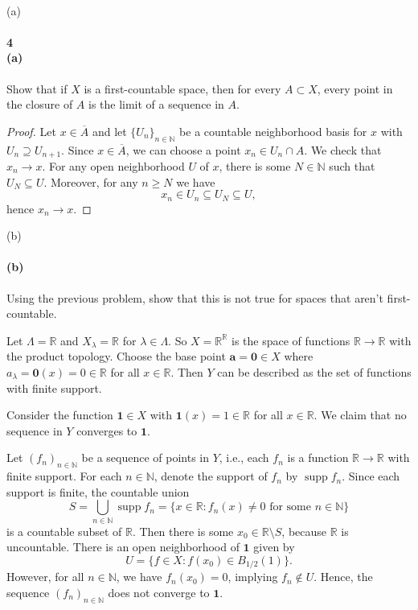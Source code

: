 \documentclass[12pt]{article}
\newlength{\myparskip}
\newenvironment{fullbox}{\begin{lrbox}{\savefullbox}\begin{minipage}{\dimexpr\textwidth-2\fboxsep\relax}\setlength{\parskip}{\myparskip}}{\end{minipage}\end{lrbox}\framebox[\textwidth]{\usebox{\savefullbox}}}
\newenvironment{pbox}[1][]{\begin{fullbox}\ifx#1\empty\else\paragraph{#1}\fi}{\end{fullbox}}
\newcommand{\N}{\mathbb{N}}
\newcommand{\R}{\mathbb{R}}
\newcommand{\<}{\langle}
\renewcommand{\>}{\rangle}
\newcommand{\clo}{\overline}
\theoremstyle{definition}
\begin{document}
\newpage
\begin{pbox}[4 \\ (a)]
    Show that if $X$ is a first-countable space, then for every $A \subset X$, every point in the closure of $A$ is the limit of a sequence in $A$.
\end{pbox}

\begin{proof}
    Let $x \in \clo{A}$ and let $\{U_n\}_{n \in \N}$ be a countable neighborhood basis for $x$ with $U_n \supseteq U_{n + 1}$. Since $x \in \clo{A}$, we can choose a point $x_n \in U_n \cap A$. We check that $x_n \to x$. For any open neighborhood $U$ of $x$, there is some $N \in \N$ such that $U_N \subseteq U$. Moreover, for any $n \geq N$ we have
    \[
        x_n \in U_n \subseteq U_N \subseteq U,
    \]
    hence $x_n \to x$.
\end{proof}

\begin{pbox}[(b)]
    Using the previous problem, show that this is not true for spaces that aren't first-countable.
\end{pbox}

Let $\Lambda = \R$ and $X_\lambda = \R$ for $\lambda \in \Lambda$.
So $X = \R^\R$ is the space of functions $\R \to \R$ with the product topology.
Choose the base point $\mathbf{a} = \mathbf{0} \in X$ where $a_\lambda = \mathbf{0}(x) = 0 \in \R$ for all $x \in \R$.
Then $Y$ can be described as the set of functions with finite support.

Consider the function $\mathbf{1} \in X$ with $\mathbf{1}(x) = 1 \in \R$ for all $x \in \R$. We claim that no sequence in $Y$ converges to $\mathbf{1}$.

Let $(f_n)_{n \in \N}$ be a sequence of points in $Y$, i.e., each $f_n$ is a function $\R \to \R$ with finite support. For each $n \in \N$, denote the support of $f_n$ by $\operatorname{supp} f_n$. Since each support is finite, the countable union
\[
    S
        = \bigcup_{n \in \N} \operatorname{supp} f_n
        = \{x \in \R : f_n(x) \ne 0 \text{ for some } n \in \N\}
\]
is a countable subset of $\R$. Then there is some $x_0 \in \R \setminus S$, because $\R$ is uncountable. There is an open neighborhood of $\mathbf{1}$ given by
\[
    U = \{f \in X : f(x_0) \in B_{1/2}(1)\}.
\]
However, for all $n \in \N$, we have $f_n(x_0) = 0$, implying $f_n \notin U$. Hence, the sequence $(f_n)_{n \in \N}$ does not converge to $\mathbf{1}$.
\end{document}
